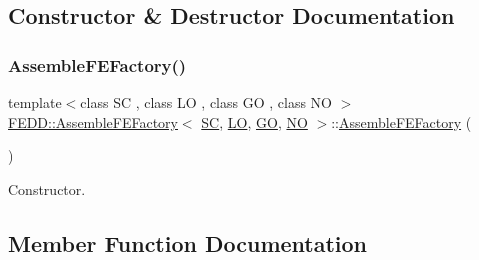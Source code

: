 \subsection{Constructor \& Destructor Documentation}
\mbox{\label{classFEDD_1_1AssembleFEFactory_a29b1ce08865f9d32e7011e208a4cebb9}} 
\subsubsection{\texorpdfstring{Assemble\+F\+E\+Factory()}{AssembleFEFactory()}}
{\footnotesize\ttfamily template$<$class SC , class LO , class GO , class NO $>$ \\
\hyperlink{classFEDD_1_1AssembleFEFactory}{F\+E\+D\+D\+::\+Assemble\+F\+E\+Factory}$<$ \hyperlink{fe__test__laplace_8cpp_a79c7e86a57edbb2a5a53242bcd04e41e}{SC}, \hyperlink{fe__test__laplace_8cpp_ad6a38c9f07d3fd633eefca5bccad8410}{LO}, \hyperlink{fe__test__laplace_8cpp_afa2946b509009b4f45eb04bd8c5b27d9}{GO}, \hyperlink{fe__test__laplace_8cpp_a5e24f37b28787429872b6ecb1d0417ce}{NO} $>$\+::\hyperlink{classFEDD_1_1AssembleFEFactory}{Assemble\+F\+E\+Factory} (\begin{DoxyParamCaption}{ }\end{DoxyParamCaption})}



Constructor. 



\subsection{Member Function Documentation}
\mbox{\label{classFEDD_1_1AssembleFEFactory_ac895d65acf2626100832586df84d6a9c}} 
